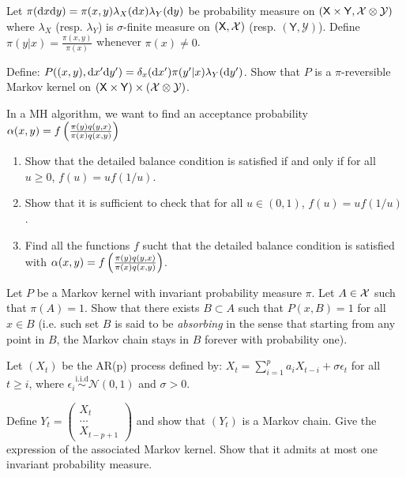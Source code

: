 \documentclass[english,graybox,envcountchap,envcountsame,sectrefs,shortlabels]{svmono}
\theoremstyle{style}
\newcommand{\iid}{\stackrel{\mathrm{i.i.d}}{\sim}}
\newcommand{\Yset}{\mathsf{Y}}
\newcommand{\Ysigma}{\mathcal{Y}}
\newcommand{\gauss}{\mathcal{N}}
\begin{document}
%
\begin{exercise}\label{exo:gibbs}
Let $\pi(\mathrm{d} x\mathrm{d} y)=\pi(x,y)\lambda_X(\mathrm{d} x) \lambda_Y(\mathrm{d} y)$ be probability measure on $(\Xset \times \Yset, \Xsigma \otimes \Ysigma)$ where  $\lambda_X$ (resp. $\lambda_Y$) is $\sigma$-finite measure on $(\mathsf{X},\mathcal{X})$ (resp. $(\Yset,\Ysigma)$). Define $\pi(y|x)=\frac{\pi(x,y)}{\pi(x)}$ whenever $\pi(x)\neq 0$.

Define: $P( (x,y),\mathrm{d} x'\mathrm{d} y')= \delta_x(\mathrm{d} x') \pi(y'|x) \lambda_Y(\mathrm{d} y')$. Show that $P$ is a $\pi$-reversible Markov kernel on  $(\Xset \times \Yset) \times (\Xsigma \otimes \Ysigma)$.
\end{exercise}

\begin{exercise}\label{exo:detailed}
In a MH algorithm, we want to find an acceptance probability $\alpha(x,y)=f\left(\frac{\pi(y)q(y,x)}{\pi(x) q(x,y)}\right)$
\begin{enumerate}
\item Show that the detailed balance condition is satisfied if and only if for all $u\geq 0$, $f(u)=uf(1/u)$.
\item Show that it is sufficient to check that for all $u\in (0,1)$, $f(u)=uf(1/u)$.
\item Find all the functions $f$ sucht that the detailed balance condition is satisfied with $\alpha(x,y)=f\left(\frac{\pi(y)q(y,x)}{\pi(x) q(x,y)}\right)$.
\end{enumerate}
\end{exercise}



%
\begin{exercise}
Let $P$ be a Markov kernel with invariant probability measure $\pi$.
Let $A\in\mathcal{X}$ such that $\pi(A)=1$. Show that there exists $B\subset A$
such that $P(x,B)=1$ for all $x\in B$ (i.e. such set $B$ is said
to be \emph{absorbing} in the sense that starting from any point in
$B$, the Markov chain stays in $B$ forever with probability one).
\end{exercise}
%

\begin{exercise} \label{exo:arp}
Let $(X_t)$ be the AR(p) process defined by: $X_t=\sum_{i=1}^{p} a_i X_{t-i}+\sigma \epsilon_t$ for all $t\geq i$,  where $\epsilon_i \iid \gauss(0,1)$ and $\sigma>0$.

Define $Y_t=\begin{pmatrix}
X_t\\
\ldots\\
X_{t-p+1}
\end{pmatrix}$ and show that $(Y_t)$ is a Markov chain. Give the expression of the associated Markov kernel. Show that it admits at most one invariant probability measure.
\end{exercise}
\end{document}
